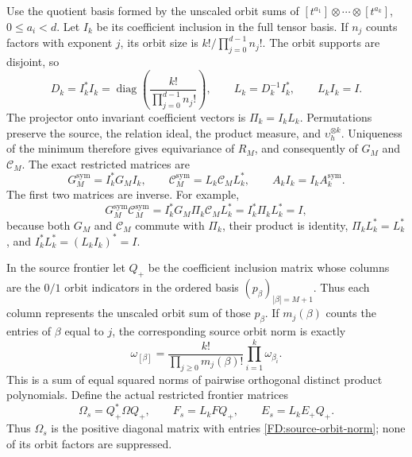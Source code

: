 Use the quotient basis formed by the unscaled orbit sums of
\([t^{a_1}]\otimes\cdots\otimes[t^{a_k}]\), \(0\le a_i<d\).
Let \(I_k\) be its coefficient inclusion in the full tensor basis.
If \(n_j\) counts factors with exponent \(j\), its orbit size is
\(k!/\prod_{j=0}^{d-1}n_j!\).  The orbit supports are disjoint, so
\begin{equation}
D_k=I_k^*I_k
=\operatorname{diag}\left(\frac{k!}{\prod_{j=0}^{d-1}n_j!}\right),
\qquad L_k=D_k^{-1}I_k^*,\qquad L_kI_k=I.
\tag{FD.22}\label{FD:orbit-coordinates}
\end{equation}
The projector onto invariant coefficient vectors is \(\Pi_k=I_kL_k\).
Permutations preserve the source, the relation ideal, the product
measure, and \(\upsilon_h^{\otimes k}\).  Uniqueness of the minimum
therefore gives equivariance of \(R_M\), and consequently of \(G_M\)
and \(\mathcal C_M\).  The exact restricted matrices are
\begin{equation}
G_M^{\mathrm{sym}}=I_k^*G_MI_k,\qquad
\mathcal C_M^{\mathrm{sym}}=L_k\mathcal C_ML_k^*,\qquad
A_kI_k=I_kA_k^{\mathrm{sym}}.
\tag{FD.23}\label{FD:symmetric-matrices}
\end{equation}
The first two matrices are inverse.  For example,
\[
G_M^{\mathrm{sym}}\mathcal C_M^{\mathrm{sym}}
=I_k^*G_M\Pi_k\mathcal C_ML_k^*
=I_k^*\Pi_kL_k^*=I,
\]
because both \(G_M\) and \(\mathcal C_M\) commute with \(\Pi_k\),
their product is identity, \(\Pi_kL_k^*=L_k^*\), and
\(I_k^*L_k^*=(L_kI_k)^*=I\).

In the source frontier let \(Q_+\) be the coefficient inclusion matrix
whose columns are the \(0/1\) orbit indicators in the ordered basis
\((p_\beta)_{|\beta|=M+1}\).  Thus each column represents the
unscaled orbit sum of those \(p_\beta\).  If \(m_j(\beta)\)
counts the entries of \(\beta\) equal to \(j\), the corresponding
source orbit norm is exactly
\begin{equation}
\omega_{[\beta]}=
\frac{k!}{\prod_{j\ge0}m_j(\beta)!}\prod_{i=1}^k\omega_{\beta_i}.
\tag{FD.24}\label{FD:source-orbit-norm}
\end{equation}
This is a sum of equal squared norms of pairwise orthogonal distinct
product polynomials.  Define the actual restricted frontier matrices
\begin{equation}
\Omega_s=Q_+^*\Omega Q_+,\qquad
F_s=L_kFQ_+,\qquad E_s=L_kE_+Q_+.
\tag{FD.25}\label{FD:symmetric-frontier}
\end{equation}
Thus \(\Omega_s\) is the positive diagonal matrix with entries
\eqref{FD:source-orbit-norm}; none of its orbit factors are suppressed.

